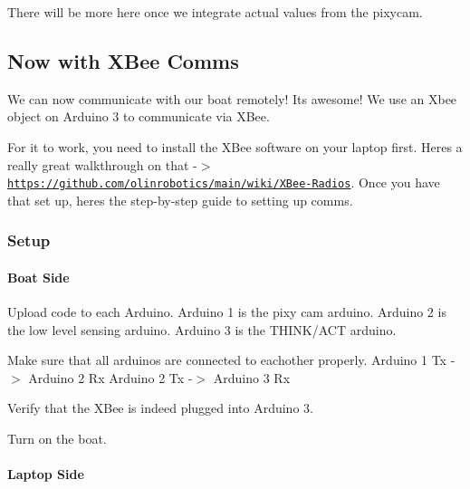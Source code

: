 There will be more here once we integrate actual values from the pixycam.

\subsection*{Now with X\+Bee Comms}

We can now communicate with our boat remotely! It\textquotesingle{}s awesome! We use an {\ttfamily Xbee} object on Arduino 3 to communicate via X\+Bee.

For it to work, you need to install the X\+Bee software on your laptop first. Here\textquotesingle{}s a really great walkthrough on that -\/$>$ \href{https://github.com/olinrobotics/main/wiki/XBee-Radios}{\tt https\+://github.\+com/olinrobotics/main/wiki/\+X\+Bee-\/\+Radios}. Once you have that set up, here\textquotesingle{}s the step-\/by-\/step guide to setting up comms.

\subsubsection*{Setup}

\paragraph*{Boat Side}


\begin{DoxyEnumerate}
\item Upload code to each Arduino. Arduino 1 is the pixy cam arduino. Arduino 2 is the low level sensing arduino. Arduino 3 is the T\+H\+I\+N\+K/\+A\+CT arduino.
\item Make sure that all arduinos are connected to eachother properly. Arduino 1 Tx -\/$>$ Arduino 2 Rx Arduino 2 Tx -\/$>$ Arduino 3 Rx
\item Verify that the X\+Bee is indeed plugged into Arduino 3.
\item Turn on the boat.
\end{DoxyEnumerate}

\paragraph*{Laptop Side}


